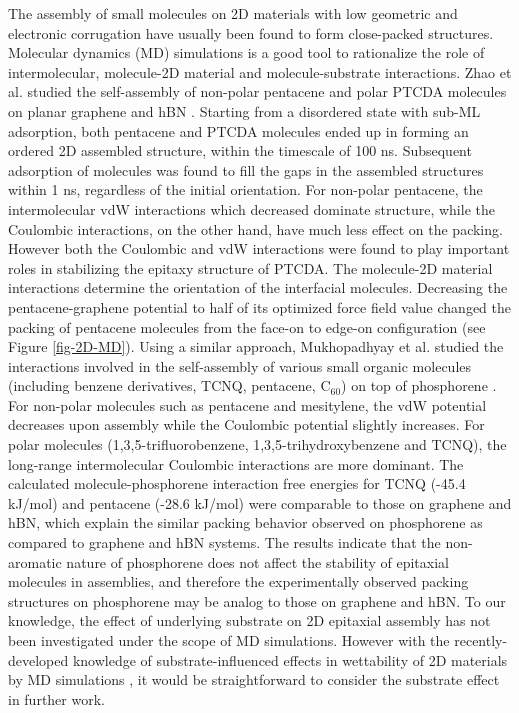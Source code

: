 The assembly of small molecules on 2D materials with low geometric and
electronic corrugation have usually been found to form close-packed
structures. Molecular dynamics (MD) simulations is a good tool to
rationalize the role of intermolecular, molecule-2D material and
molecule-substrate interactions. Zhao et al. studied the self-assembly
of non-polar pentacene and polar PTCDA molecules on planar graphene
and hBN \cite{Zhao_2015_self_assemb_gr_MD}. Starting from a disordered
state with sub-ML adsorption, both pentacene and PTCDA molecules ended
up in forming an ordered 2D assembled structure, within the timescale
of 100 ns. Subsequent adsorption of molecules was found to fill the
gaps in the assembled structures within 1 ns, regardless of the
initial orientation. For non-polar pentacene, the intermolecular vdW
interactions which decreased dominate structure, while the Coulombic
interactions, on the other hand, have much less effect on the
packing. However both the Coulombic and vdW interactions were found to
play important roles in stabilizing the epitaxy structure of
PTCDA. The molecule-2D material interactions determine the orientation
of the interfacial molecules. Decreasing the pentacene-graphene
potential to half of its optimized force field value changed the
packing of pentacene molecules from the face-on to edge-on
configuration (see Figure \ref{fig-2D-MD}). Using a similar approach,
Mukhopadhyay et al. studied the interactions involved in the
self-assembly of various small organic molecules (including benzene
derivatives, TCNQ, pentacene, C\(_{\text{60}}\)) on top of phosphorene
\cite{Mukhopadhyay_2017_cryst_BP}. For non-polar molecules such as
pentacene and mesitylene, the vdW potential decreases upon assembly
while the Coulombic potential slightly increases. For polar molecules
(1,3,5-trifluorobenzene, 1,3,5-trihydroxybenzene and TCNQ), the
long-range intermolecular Coulombic interactions are more
dominant. The calculated molecule-phosphorene interaction free
energies for TCNQ (-45.4 kJ/mol) and pentacene (-28.6 kJ/mol) were
comparable to those on graphene and hBN, which explain the similar
packing behavior observed on phosphorene as compared to graphene and
hBN systems. The results indicate that the non-aromatic nature of
phosphorene does not affect the stability of epitaxial molecules in
assemblies, and therefore the experimentally observed packing
structures on phosphorene may be analog to those on graphene and
hBN. To our knowledge, the effect of underlying substrate on 2D
epitaxial assembly has not been investigated under the scope of MD
simulations. However with the recently-developed knowledge of
substrate-influenced effects in wettability of 2D materials by MD
simulations \cite{shih_breakdown_2012,Hung_2015_MD_water_sub}, it would
be straightforward to consider the substrate effect in further work.

